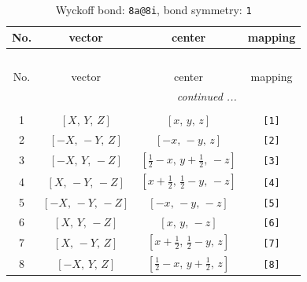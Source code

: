 \documentclass[fleqn,8pt]{jsarticle}
\begin{document}
\begin{longtable}{cccc}
\caption{Wyckoff bond: {\tt 8a@8i}, bond symmetry: {\tt 1}}
 \\
 \hline \hline
No. & vector & center & mapping \\ \hline \endfirsthead

\multicolumn{3}{l}{\tablename\ \thetable{}} \\
 \hline \hline
No. & vector & center & mapping \\ \hline \endhead

 \hline \hline
\multicolumn{3}{r}{\footnotesize\it continued ...} \\ \endfoot

 \hline \hline
\multicolumn{3}{r}{} \\ \endlastfoot

1 & $\left[ X,\, Y,\, Z \right]$ & $\left[ x,\, y,\, z \right]$ & {\tt [1]} \\ \hline
2 & $\left[ - X,\, - Y,\, Z \right]$ & $\left[ - x,\, - y,\, z \right]$ & {\tt [2]} \\ \hline
3 & $\left[ - X,\, Y,\, - Z \right]$ & $\left[ \frac{1}{2} - x,\, y + \frac{1}{2},\, - z \right]$ & {\tt [3]} \\ \hline
4 & $\left[ X,\, - Y,\, - Z \right]$ & $\left[ x + \frac{1}{2},\, \frac{1}{2} - y,\, - z \right]$ & {\tt [4]} \\ \hline
5 & $\left[ - X,\, - Y,\, - Z \right]$ & $\left[ - x,\, - y,\, - z \right]$ & {\tt [5]} \\ \hline
6 & $\left[ X,\, Y,\, - Z \right]$ & $\left[ x,\, y,\, - z \right]$ & {\tt [6]} \\ \hline
7 & $\left[ X,\, - Y,\, Z \right]$ & $\left[ x + \frac{1}{2},\, \frac{1}{2} - y,\, z \right]$ & {\tt [7]} \\ \hline
8 & $\left[ - X,\, Y,\, Z \right]$ & $\left[ \frac{1}{2} - x,\, y + \frac{1}{2},\, z \right]$ & {\tt [8]} \\
\end{longtable}
\end{document}
